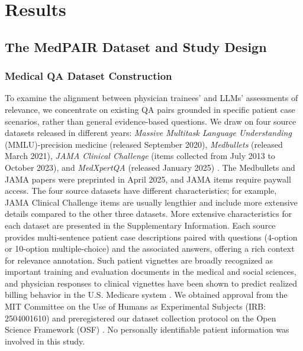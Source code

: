 \documentclass[fleqn,10pt]{wlscirep}
\begin{document}
\section{Results}
\subsection{The MedPAIR Dataset and Study Design}

\subsubsection{Medical QA Dataset Construction}
To examine the alignment between physician trainees’ and LLMs’ assessments of relevance, we concentrate on existing QA pairs grounded in specific patient case scenarios, rather than general evidence-based questions. We draw on four source datasets released in different years: \textit{Massive Multitask Language Understanding}  (MMLU)-precision medicine (released September 2020)\cite{hendrycks_measuring_2021}, \textit{Medbullets} (released March 2021), \textit{JAMA Clinical Challenge} (items collected from July 2013 to October 2023)\cite{chen_benchmarking_2025}, and \textit{MedXpertQA} (released January 2025) \cite{zuo_medxpertqa_2025}. The Medbullets and JAMA papers were preprinted in April 2025, and JAMA items require paywall access. The four source datasets have different characteristics; for example, JAMA Clinical Challenge items are usually lengthier and include more extensive details compared to the other three datasets. More extensive characteristics for each dataset are presented in the Supplementary Information. Each source provides multi-sentence patient case descriptions paired with questions (4-option or 10-option multiple-choice) and the associated answers, offering a rich context for relevance annotation. Such patient vignettes are broadly recognized as important training and evaluation documents in the medical and social sciences, and physician responses to clinical vignettes have been shown to predict realized billing behavior in the U.S. Medicare system \cite{cutler_physician_2019}. We obtained approval from the MIT Committee on the Use of Humans as Experimental Subjects (IRB: 2504001610) and preregistered our dataset collection protocol on the Open Science Framework (OSF) \cite{hao_alhamoud_jeong_puri_torr_kalantari_schaekermann_stern_ghassemi_2025}. No personally identifiable patient information was involved in this study.

\end{document}

